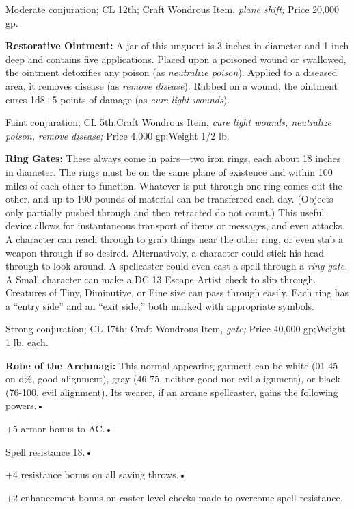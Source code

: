 \documentclass{article}
\begin{document}
Moderate conjuration; CL 12th; Craft Wondrous Item, \textit{plane shift; }Price 
20,000 gp.

\textbf{Restorative Ointment: }A jar of this unguent is 3 inches in diameter and 
1 inch deep and contains five applications. Placed upon a poisoned wound or swallowed, 
the ointment detoxifies any poison (as \textit{neutralize poison}). Applied to 
a diseased area, it removes disease (as \textit{remove disease}). Rubbed on a wound, 
the ointment cures 1d8+5 points of damage (as \textit{cure light wounds}).

Faint conjuration; CL 5th;Craft Wondrous Item, \textit{cure light wounds, neutralize 
poison, remove disease; }Price 4,000 gp;Weight 1/2 lb.

\textbf{Ring Gates:} These always come in pairs---two iron rings, each about 18 
inches in diameter. The rings must be on the same plane of existence and within 
100 miles of each other to function. Whatever is put through one ring comes out 
the other, and up to 100 pounds of material can be transferred each day. (Objects 
only partially pushed through and then retracted do not count.) This useful device 
allows for instantaneous transport of items or messages, and even attacks. A character 
can reach through to grab things near the other ring, or even stab a weapon through 
if so desired. Alternatively, a character could stick his head through to look 
around. A spellcaster could even cast a spell through a \textit{ring gate. }A Small 
character can make a DC 13 Escape Artist check to slip through. Creatures of Tiny, 
Diminutive, or Fine size can pass through easily. Each ring has a ``entry side'' 
and an ``exit side,'' both marked with appropriate symbols.

Strong conjuration; CL 17th; Craft Wondrous Item, \textit{gate; }Price 40,000 gp;Weight 
1 lb. each.

\textbf{Robe of the Archmagi:} This normal-appearing garment can be white (01-45 
on d\%, good alignment), gray (46-75, neither good nor evil alignment), or black 
(76-100, evil alignment). Its wearer, if an arcane spellcaster, gains the following 
powers.• 

\parindent=3pt
+5 armor bonus to AC.• 

Spell resistance 18.• 

\parindent=7pt
+4 resistance bonus on all saving throws.• 

\parindent=3pt
+2 enhancement bonus on caster level checks made to overcome spell resistance.
\end{document}
